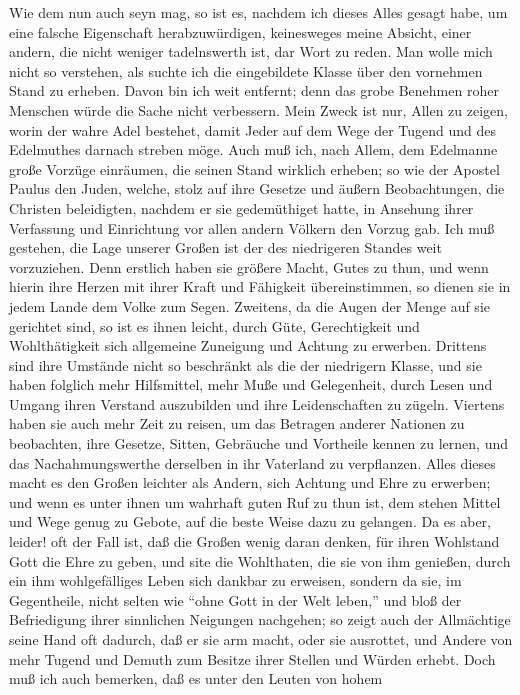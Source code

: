 Wie dem nun auch seyn mag, so ist es, nachdem ich dieses Alles gesagt habe, um
eine falsche Eigenschaft herabzuwürdigen, keinesweges meine Absicht, einer
andern, die nicht weniger tadelnswerth ist, dar Wort zu reden. Man wolle mich
nicht so verstehen, als suchte ich die eingebildete Klasse über den vornehmen
Stand zu erheben. Davon bin ich weit entfernt; denn das grobe Benehmen roher
Menschen würde die Sache nicht verbessern. Mein Zweck ist nur, Allen zu zeigen,
worin der wahre Adel bestehet, damit Jeder auf dem Wege der Tugend und des
Edelmuthes darnach streben möge. Auch muß ich, nach Allem, dem Edelmanne große
Vorzüge einräumen, die seinen Stand wirklich erheben; so wie der Apostel Paulus
den Juden, welche, stolz auf ihre Gesetze und äußern Beobachtungen, die Christen
beleidigten, nachdem er sie gedemüthiget hatte, in Ansehung ihrer Verfassung und
Einrichtung vor allen andern Völkern den Vorzug gab. Ich muß gestehen, die Lage
unserer Großen ist der des niedrigeren Standes weit vorzuziehen. Denn erstlich
haben sie größere Macht, Gutes zu thun, und wenn hierin ihre Herzen mit ihrer
Kraft und Fähigkeit übereinstimmen, so dienen sie in jedem Lande dem Volke zum
Segen. Zweitens, da die Augen der Menge auf sie gerichtet sind, so ist es ihnen
leicht, durch Güte, Gerechtigkeit und Wohlthätigkeit sich allgemeine Zuneigung
und Achtung zu erwerben. Drittens sind ihre Umstände nicht so beschränkt als die
der niedrigern Klasse, und sie haben folglich mehr Hilfsmittel, mehr Muße und
Gelegenheit, durch Lesen und Umgang ihren Verstand auszubilden und ihre
Leidenschaften zu zügeln. Viertens haben sie auch mehr Zeit zu reisen, um das
Betragen anderer Nationen zu beobachten, ihre Gesetze, Sitten, Gebräuche und
Vortheile kennen zu lernen, und das Nachahmungswerthe derselben in ihr Vaterland
zu verpflanzen. Alles dieses macht es den Großen leichter als Andern, sich
Achtung und Ehre zu erwerben; und wenn es unter ihnen um wahrhaft guten Ruf zu
thun ist, dem stehen Mittel und Wege genug zu Gebote, auf die beste Weise dazu
zu gelangen. Da es aber, leider! oft der Fall ist, daß die Großen wenig daran
denken, für ihren Wohlstand Gott die Ehre zu geben, und site die Wohlthaten, die
sie von ihm genießen, durch ein ihm wohlgefälliges Leben sich dankbar zu
erweisen, sondern da sie, im Gegentheile, nicht selten wie "`ohne Gott in der
Welt leben,"'  und bloß der Befriedigung ihrer sinnlichen Neigungen nachgehen;
so zeigt auch der Allmächtige seine Hand oft dadurch, daß er sie arm macht, oder
sie ausrottet, und Andere von mehr Tugend und Demuth zum Besitze ihrer Stellen
und Würden erhebt. Doch muß ich auch bemerken, daß es unter den Leuten von hohem
